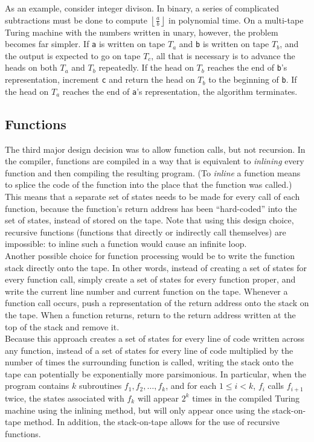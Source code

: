 \documentclass[11pt]{report}
\begin{document}
As an example, consider integer divison. In binary, a series of complicated subtractions must be done to compute $\left \lfloor{\frac{a}{b}}\right \rfloor$ in polynomial time. On a multi-tape Turing machine with the numbers written in unary, however, the problem becomes far simpler. If \texttt{a} is written on tape $T_a$ and \texttt{b} is written on tape $T_b$, and the output is expected to go on tape $T_c$, all that is necessary is to advance the heads on both $T_a$ and $T_b$ repeatedly. If the head on $T_b$ reaches the end of \texttt{b}'s representation, increment \texttt{c} and return the head on $T_b$ to the beginning of \texttt{b}. If the head on $T_a$ reaches the end of \texttt{a}'s representation, the algorithm terminates. \\

\subsection{Functions \label{sec:functions}}

The third major design decision was to allow function calls, but not recursion. In the compiler, functions are compiled in a way that is equivalent to \emph{inlining} every function and then compiling the resulting program. (To \emph{inline} a function means to splice the code of the function into the place that the function was called.) This means that a separate set of states needs to be made for every call of each function, because the function's return address has been ``hard-coded'' into the set of states, instead of stored on the tape. Note that using this design choice, recursive functions (functions that directly or indirectly call themselves) are impossible: to inline such a function would cause an infinite loop. \\

Another possible choice for function processing would be to write the function stack directly onto the tape. In other words, instead of creating a set of states for every function call, simply create a set of states for every function proper, and write the current line number and current function on the tape. Whenever a function call occurs, push a representation of the return address onto the stack on the tape. When a function returns, return to the return address written at the top of the stack and remove it. \\

Because this approach creates a set of states for every line of code written across any function, instead of a set of states for every line of code multiplied by the number of times the surrounding function is called, writing the stack onto the tape can potentially be exponentially more parsimonious. In particular, when the program contains $k$ subroutines $f_1, f_2, \dots, f_k$, and for each $1 \le i < k$, $f_i$ calls $f_{i+1}$ twice, the states associated with $f_k$ will appear $2^k$ times in the compiled Turing machine using the inlining method, but will only appear once using the stack-on-tape method. In addition, the stack-on-tape allows for the use of recursive functions.\\
\end{document}

